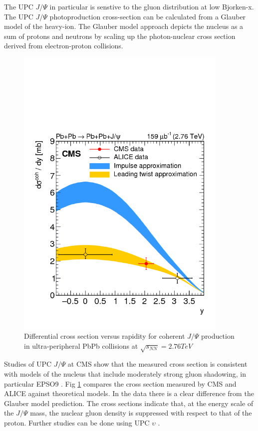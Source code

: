 The UPC $J/\Psi$ in particular is senstive to the gluon distribution at low Bjorken-x. The UPC $J/\Psi$ photoproduction cross-section can be calculated from a Glauber model of the heavy-ion. The Glauber model approach depicts the nucleus as a sum of protons and neutrons by scaling up the photon-nuclear cross section derived from electron-proton collisions. 
\begin{figure}[h!]
\begin{centering}
\includegraphics[width=4in]{Chapter2/importfigs/patkenny_Figure_002.png}
\par\end{centering}
\caption{Differential cross section versus rapidity for coherent $J/\Psi$ production in ultra-peripheral PbPb collisions at $\sqrt{s_{NN}}=2.76 TeV$ \cite{Khachatryan:2016qhq} \label{fig:pk3}}
\end{figure}
 
Studies of UPC $J/\Psi$ at CMS show that the measured cross section is consistent with models of the nucleus that include moderately strong gluon shadowing, in particular EPSO9 \cite{lta2013.05}. Fig \ref{fig:pk3} compares the cross section measured by CMS and ALICE against theoretical models. In the data there is a clear difference from the Glauber model prediction. The cross sections indicate that, at the energy scale of the $J/\Psi$ mass, the nuclear gluon density is suppressed with respect to that of the proton. Further studies can be done using UPC $\upsilon$ \cite{pQCD2013.02}. 

